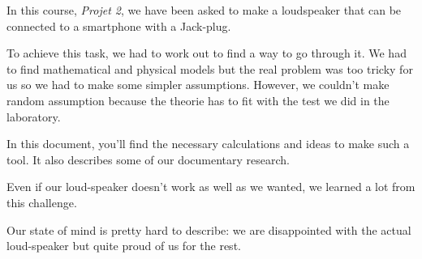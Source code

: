 

\begin{abstract-en}

In this course, \textit{Projet 2}, we have been asked to make a loudspeaker that can be connected to a smartphone with a Jack-plug.

To achieve this task, we had to work out to find a way to go through it.
We had to find mathematical and physical models but the real problem was too tricky for us so we had to make some simpler assumptions.
However, we couldn't make random assumption because the theorie has to fit with the test we did in the laboratory.

In this document, you'll find the necessary calculations and ideas to make such a tool. It also describes some
of our documentary research.

Even if our loud-speaker doesn't work as well as we wanted, we learned a lot from this challenge. 

Our state of mind is pretty hard to describe: we are disappointed with the actual loud-speaker but quite proud of us for the rest.

\end{abstract-en}


